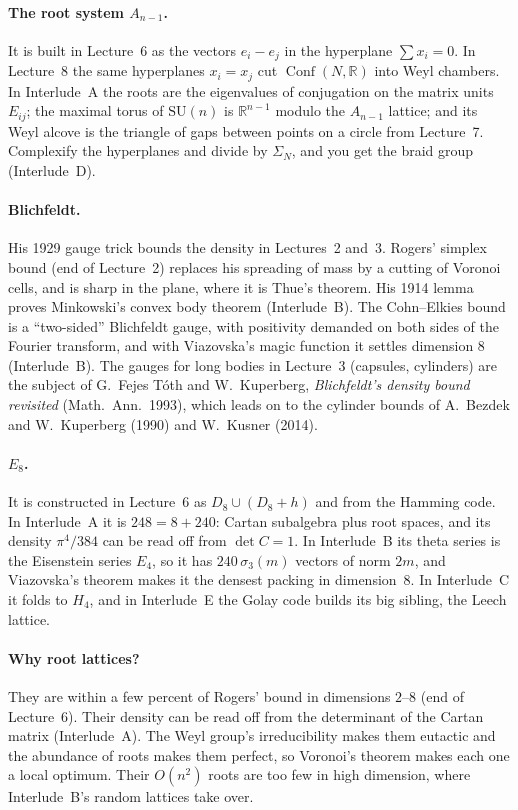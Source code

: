 \documentclass[11pt,openany]{book}
\theoremstyle{plain}
\theoremstyle{definition}
\theoremstyle{remark}
\newcommand{\R}{\mathbb{R}}
\newcommand{\Conf}{\operatorname{Conf}}
\begin{document}
\paragraph{The root system $A_{n-1}$.} It is built in Lecture~6 as the vectors $e_i-e_j$ in the
hyperplane $\sum x_i=0$. In Lecture~8 the same hyperplanes $x_i=x_j$ cut $\Conf(N,\R)$ into Weyl
chambers. In Interlude~A the roots are the eigenvalues of conjugation on the matrix units
$E_{ij}$; the maximal torus of $\mathrm{SU}(n)$ is $\R^{n-1}$ modulo the $A_{n-1}$ lattice; and its Weyl
alcove is the triangle of gaps between points on a circle from Lecture~7. Complexify the hyperplanes
and divide by $\Sigma_N$, and you get the braid group (Interlude~D).

\paragraph{Blichfeldt.} His 1929 gauge trick bounds the density in Lectures~2 and~3. Rogers' simplex bound (end of Lecture~2) replaces his
spreading of mass by a cutting of Voronoi cells, and is sharp in the plane, where it is Thue's theorem. His 1914 lemma
proves Minkowski's convex body theorem (Interlude~B). The Cohn--Elkies bound is a ``two-sided''
Blichfeldt gauge, with positivity demanded on both sides of the Fourier transform, and with Viazovska's
magic function it settles dimension $8$ (Interlude~B). The gauges for long bodies in Lecture~3 (capsules, cylinders) are the
subject of G.~Fejes T\'oth and W.~Kuperberg, \emph{Blichfeldt's density bound revisited} (Math.\ Ann.\ 1993),
which leads on to the cylinder bounds of A.~Bezdek and W.~Kuperberg (1990) and W.~Kusner (2014).

\paragraph{$E_8$.} It is constructed in Lecture~6 as $D_8\cup(D_8+h)$ and from the Hamming code. In
Interlude~A it is $248=8+240$: Cartan subalgebra plus root spaces, and its density $\pi^4/384$ can be
read off from $\det C=1$. In Interlude~B its theta series is the Eisenstein series $E_4$, so it has
$240\,\sigma_3(m)$ vectors of norm $2m$, and Viazovska's theorem makes it the densest packing in
dimension~$8$. In Interlude~C it folds to $H_4$, and in Interlude~E the Golay code builds its big
sibling, the Leech lattice.

\paragraph{Why root lattices?} They are within a few percent of Rogers' bound in dimensions $2$--$8$
(end of Lecture~6). Their density can be read off from the determinant of the Cartan matrix
(Interlude~A). The Weyl group's irreducibility makes them eutactic and the abundance of roots makes them
perfect, so Voronoi's theorem makes each one a local optimum. Their $O(n^2)$ roots are too few in high
dimension, where Interlude~B's random lattices take over.
\end{document}
